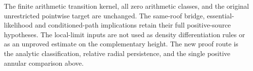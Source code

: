 The finite arithmetic transition kernel, all zero arithmetic classes,
and the original unrestricted pointwise target are unchanged. The
same-roof bridge, essential-likelihood and conditioned-path implications
retain their full positive-source hypotheses. The local-limit inputs
\cite{SV,DN,DPZ} are not used as density differentiation rules or as
an unproved estimate on the complementary height. The new proof route
is the analytic classification, relative radial persistence, and the
single positive annular comparison above.

\label{end:v68-new-mathematics}
